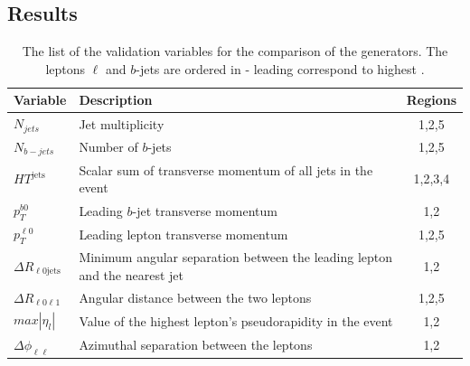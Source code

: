 \subsection{Results}
\begin{table}[]
\begin{center}
\caption{\label{tab:ttw_varlist}
The list of the validation variables for the comparison of the \ttW generators. The leptons $\ell$ and $b$-jets are ordered in \pt - leading correspond to highest \pt. }
\vspace{0.25cm}
{\small
\setlength\tabcolsep{1.5pt}
\begin{tabular}{l|l|c}
\hline\hline
Variable & Description & Regions \\ \hline
$N_{jets}$   &     Jet multiplicity        &      1,2,5   \\ %
 $N_{b-jets}$       &     Number of  $b$-jets       &   1,2,5      \\ %
$HT^{\text{jets}}$      & Scalar sum of transverse momentum of all jets in the event         &  1,2,3,4       \\ %
$p_T^{b0}$       &      Leading $b$-jet transverse momentum       &   1,2      \\ %
 $p_T^{\ell 0}$      &   Leading lepton transverse momentum           &     1,2,5    \\ %
$\Delta R _{ \ell 0\mathrm{jets} }$      &     Minimum angular separation between the leading lepton and the nearest jet         &  1,2       \\ %
$\Delta R _{\ell 0\ell1 }$      &       Angular distance between the two leptons      &    1,2,5    \\ %
$max |\eta _l|$      &    Value of the highest lepton's pseudorapidity in the event        &     1,2    \\ %
    $\Delta \phi _{\ell \ell }$    &    Azimuthal separation between the leptons         & 1,2    \\
    \hline\hline    
\end{tabular}
}
\end{center}
\end{table}


